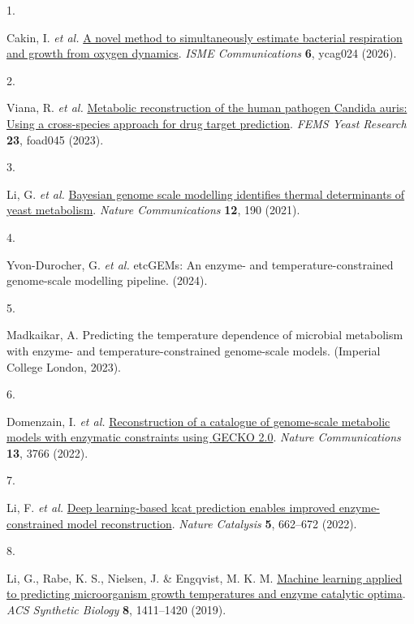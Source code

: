 \documentclass[
]{article}
\newlength{\cslhangindent}
\newlength{\csllabelwidth}
\newenvironment{CSLReferences}[2] %
 {\begin{list}{}{%
  \setlength{\itemindent}{0pt}
  \setlength{\leftmargin}{0pt}
  \setlength{\parsep}{0pt}
  \ifodd #1
   \setlength{\leftmargin}{\cslhangindent}
   \setlength{\itemindent}{-1\cslhangindent}
  \fi
  \setlength{\itemsep}{#2\baselineskip}}}
 {\end{list}}
\newcommand{\CSLLeftMargin}[1]{\parbox[t]{\csllabelwidth}{\strut#1\strut}}
\newcommand{\CSLRightInline}[1]{\parbox[t]{\linewidth - \csllabelwidth}{\strut#1\strut}}
\begin{document}
\protect{}\label{refs}
\begin{CSLReferences}{0}{0}
\CSLLeftMargin{1. }%
\CSLRightInline{Cakin, I. \emph{et al.}
\href{https://doi.org/10.1093/ismeco/ycag024}{A novel method to
simultaneously estimate bacterial respiration and growth from oxygen
dynamics}. \emph{ISME Communications} \textbf{6}, ycag024 (2026).}

\CSLLeftMargin{2. }%
\CSLRightInline{Viana, R. \emph{et al.}
\href{https://doi.org/10.1093/femsyr/foad045}{Metabolic reconstruction
of the human pathogen {Candida} auris: Using a cross-species approach
for drug target prediction}. \emph{FEMS Yeast Research} \textbf{23},
foad045 (2023).}

\CSLLeftMargin{3. }%
\CSLRightInline{Li, G. \emph{et al.}
\href{https://doi.org/10.1038/s41467-020-20338-2}{Bayesian genome scale
modelling identifies thermal determinants of yeast metabolism}.
\emph{Nature Communications} \textbf{12}, 190 (2021).}

\CSLLeftMargin{4. }%
\CSLRightInline{{Yvon-Durocher, G. \emph{et al.}} {etcGEMs}: An enzyme-
and temperature-constrained genome-scale modelling pipeline. (2024).}

\CSLLeftMargin{5. }%
\CSLRightInline{Madkaikar, A. Predicting the temperature dependence of
microbial metabolism with enzyme- and temperature-constrained
genome-scale models. (Imperial College London, 2023).}

\CSLLeftMargin{6. }%
\CSLRightInline{Domenzain, I. \emph{et al.}
\href{https://doi.org/10.1038/s41467-022-31421-1}{Reconstruction of a
catalogue of genome-scale metabolic models with enzymatic constraints
using {GECKO} 2.0}. \emph{Nature Communications} \textbf{13}, 3766
(2022).}

\CSLLeftMargin{7. }%
\CSLRightInline{Li, F. \emph{et al.}
\href{https://doi.org/10.1038/s41929-022-00798-z}{Deep learning-based
{kcat} prediction enables improved enzyme-constrained model
reconstruction}. \emph{Nature Catalysis} \textbf{5}, 662--672 (2022).}

\CSLLeftMargin{8. }%
\CSLRightInline{Li, G., Rabe, K. S., Nielsen, J. \& Engqvist, M. K. M.
\href{https://doi.org/10.1021/acssynbio.9b00099}{Machine learning
applied to predicting microorganism growth temperatures and enzyme
catalytic optima}. \emph{ACS Synthetic Biology} \textbf{8}, 1411--1420
(2019).}


\end{CSLReferences}
\end{document}
